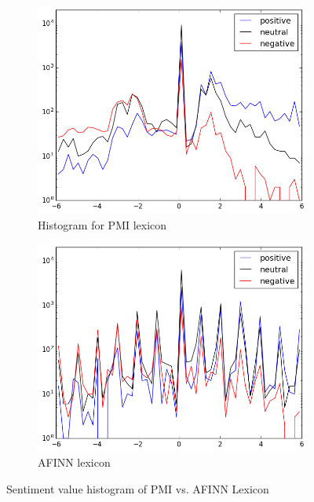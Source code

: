 \begin{figure}[t]
    \centering
    \begin{subfigure}[b]{0.49\textwidth}
        \includegraphics[width=\textwidth]{./figs/distrib/pmi}
        \caption{Histogram for PMI lexicon}
        \label{fig:distrib_pmi}
    \end{subfigure}
    \begin{subfigure}[b]{0.49\textwidth}
        \includegraphics[width=\textwidth]{./figs/distrib/afinn}
        \caption{AFINN lexicon}
        \label{fig:distrib_afinn}
    \end{subfigure}
    \caption{Sentiment value histogram of PMI vs. AFINN Lexicon}
    \label{fig:distrib_comparison}
\end{figure}

